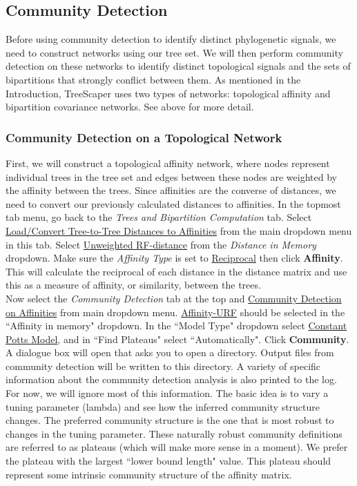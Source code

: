 \documentclass[11pt]{article}
\begin{document}
\subsection{Community Detection}\label{subsect:CommunityDetection}

Before using community detection to identify distinct phylogenetic signals, we need
to construct networks using our tree set. We will then perform community detection on
these networks to identify distinct topological signals and the sets of bipartitions that strongly
conflict between them. As mentioned in the Introduction, TreeScaper uses two types of
networks: topological affinity and bipartition covariance networks. See above for more detail. \\

\subsubsection{Community Detection on a Topological Network}\label{subsubsect:CommunityDetectionTopologicalNetwork}

First, we will construct a topological affinity network, where nodes represent
individual trees in the tree set and edges between these nodes are weighted by the affinity
between the trees. Since affinities are the converse of distances, we need to convert our
previously calculated distances to affinities. In the topmost tab menu, go back to the {\it Trees
and Bipartition Computation} tab. Select \ul{Load/Convert Tree-to-Tree Distances to Affinities}
from the main dropdown menu in this tab. Select \ul{Unweighted RF-distance} from the {\it Distance
in Memory} dropdown. Make sure the {\it Affinity Type} is set to \ul{Reciprocal} then click {\bf Affinity}.
This will calculate the reciprocal of each distance in the distance matrix and use this as a
measure of affinity, or similarity, between the trees. \\


Now select the {\it Community Detection} tab at the top and \ul{Community Detection on
Affinities} from main dropdown menu. \ul{Affinity-URF} should be selected in the ``Affinity in
memory" dropdown. In the ``Model Type" dropdown select \ul{Constant Potts Model}, and in
``Find Plateaus" select ``Automatically". Click {\bf Community}. A dialogue box will open that asks you 
to open a directory. Output files from community detection will be written to this directory. A variety of specific information
about the community detection analysis is also printed to the log. For now, we will ignore most of
this information. The basic idea is to vary a tuning parameter (lambda) and see how the
inferred community structure changes. The preferred community structure is the one that is
most robust to changes in the tuning parameter. These naturally robust community
definitions are referred to as plateaus (which will make more sense in a moment). We prefer
the plateau with the largest ``lower bound length" value. This plateau should represent some
intrinsic community structure of the affinity matrix. \\
\end{document}
